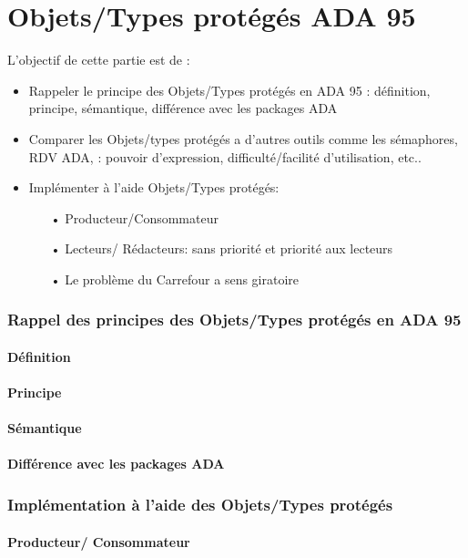 \documentclass[11pt,a4paper]{article}
\begin{document}
\part{Objets/Types protégés ADA 95}
L'objectif de cette partie est de :
\begin{itemize}
    \item Rappeler le principe des Objets/Types protégés en ADA 95 : définition, principe, sémantique, différence avec les packages ADA
    \item Comparer les  Objets/types protégés a d'autres outils comme  les sémaphores, RDV ADA, : pouvoir d'expression, difficulté/facilité d'utilisation, etc..
    \item  Implémenter à l'aide Objets/Types protégés:
          \begin{itemize}
            \item[•] Producteur/Consommateur
            \item[•] Lecteurs/ Rédacteurs: sans priorité et  priorité aux lecteurs
            \item[•] Le problème du Carrefour a sens giratoire  
          \end{itemize}
\end{itemize}
\section{Rappel des principes des Objets/Types protégés en ADA 95}
\subsection{Définition}
\subsection{Principe}
\subsection{Sémantique}
\subsection{Différence avec les packages ADA}
\section{Implémentation à l'aide des Objets/Types protégés}
\newpage
\subsection{Producteur/ Consommateur}
\begin{scriptsize}
    
\end{scriptsize}
\newpage
\end{document}
